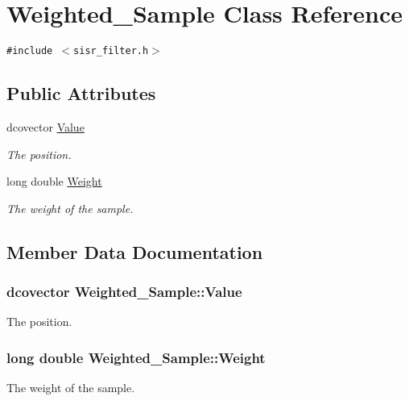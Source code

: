 \hypertarget{class_weighted___sample}{
\section{Weighted\_\-Sample Class Reference}
\label{class_weighted___sample}
}
{\tt \#include $<$sisr\_\-filter.h$>$}

\subsection*{Public Attributes}
\begin{CompactItemize}
\item 
dcovector \hyperlink{class_weighted___sample_e6c7d5be67327a3f46da6e62e5602203}{Value}
\begin{CompactList}\small\item\em The position. \item\end{CompactList}\item 
long double \hyperlink{class_weighted___sample_cabb8bc4261a082d4b87a202f5e30a7b}{Weight}
\begin{CompactList}\small\item\em The weight of the sample. \item\end{CompactList}\end{CompactItemize}


\subsection{Member Data Documentation}
\hypertarget{class_weighted___sample_e6c7d5be67327a3f46da6e62e5602203}{
\subsubsection[{Value}]{\setlength{\rightskip}{0pt plus 5cm}dcovector {\bf Weighted\_\-Sample::Value}}}
\label{class_weighted___sample_e6c7d5be67327a3f46da6e62e5602203}


The position. 

\hypertarget{class_weighted___sample_cabb8bc4261a082d4b87a202f5e30a7b}{
\subsubsection[{Weight}]{\setlength{\rightskip}{0pt plus 5cm}long double {\bf Weighted\_\-Sample::Weight}}}
\label{class_weighted___sample_cabb8bc4261a082d4b87a202f5e30a7b}


The weight of the sample. 

